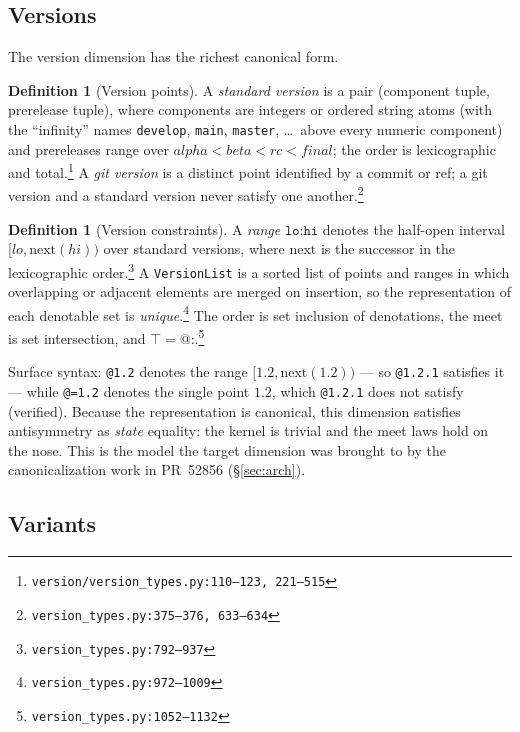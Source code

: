 \documentclass[11pt]{article}
\theoremstyle{definition}
\newtheorem{definition}[theorem]{Definition}
\theoremstyle{remark}
\newcommand{\code}[1]{\texttt{#1}}
\newcommand{\src}[1]{\footnote{\code{#1}}}
\begin{document}
\subsection{Versions}\label{sec:versions}

The version dimension has the richest canonical form.

\begin{definition}[Version points]
A \emph{standard version} is a pair (component tuple, prerelease tuple), where
components are integers or ordered string atoms (with the ``infinity''
names \code{develop}, \code{main}, \code{master}, \dots\ above every numeric
component) and prereleases range over
$\mathit{alpha} < \mathit{beta} < \mathit{rc} < \mathit{final}$; the order is
lexicographic and total.\src{version/version\_types.py:110--123, 221--515}
A \emph{git version} is a distinct point identified by a commit or ref; a git
version and a standard version never satisfy one
another.\src{version\_types.py:375--376, 633--634}
\end{definition}

\begin{definition}[Version constraints]
A \emph{range} $\code{lo:hi}$ denotes the half-open interval
$[\mathit{lo}, \mathrm{next}(\mathit{hi}))$ over standard versions, where
$\mathrm{next}$ is the successor in the lexicographic
order.\src{version\_types.py:792--937}  A \code{VersionList} is a sorted list
of points and ranges in which overlapping or adjacent elements are merged on
insertion, so the representation of each denotable set is
\emph{unique}.\src{version\_types.py:972--1009}  The order is set inclusion of
denotations, the meet is set intersection, and
$\top = \code{@:}$.\src{version\_types.py:1052--1132}
\end{definition}

Surface syntax: \code{@1.2} denotes the range $[1.2, \mathrm{next}(1.2))$ ---
so \code{@1.2.1} satisfies it --- while \code{@=1.2} denotes the single point
$1.2$, which \code{@1.2.1} does not satisfy (verified).  Because the
representation is canonical, this dimension satisfies antisymmetry as
\emph{state} equality: the kernel is trivial and the meet laws hold on the
nose.  This is the model the target dimension was brought to by the
canonicalization work in PR~52856 (\S\ref{sec:arch}).

\subsection{Variants}\label{sec:variants}
\end{document}
